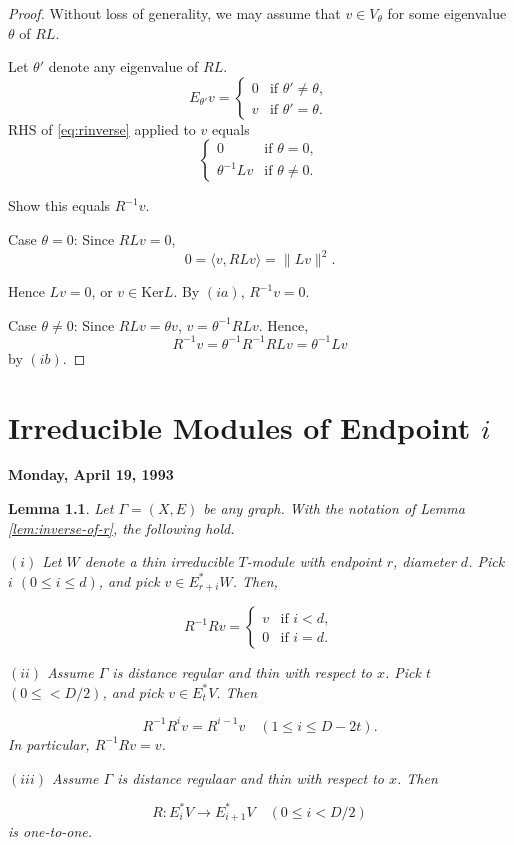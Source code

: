 \documentclass[
]{book}
\newtheorem{lemma}{Lemma}[chapter]
\theoremstyle{definition}
\theoremstyle{definition}
\theoremstyle{definition}
\theoremstyle{definition}
\theoremstyle{remark}
\begin{document}
\begin{proof}
Without loss of generality, we may assume that \(v\in V_\theta\) for some eigenvalue \(\theta\) of \(RL\).

Let \(\theta'\) denote any eigenvalue of \(RL\).
\[E_{\theta'}v = \begin{cases} 0 & \text{if } \theta'\neq \theta,\\
v & \text{if } \theta' = \theta.
\end{cases}\]
\(\mathrm{RHS}\) of \eqref{eq:rinverse} applied to \(v\) equals
\[\begin{cases} 0 & \text{if } \theta = 0,\\
\theta^{-1}Lv & \text{if } \theta \neq 0.
\end{cases}\]

Show this equals \(R^{-1}v\).

Case \(\theta = 0\):
Since \(RLv = 0\),
\[0 = \langle v, RLv\rangle = \|Lv\|^2.\]

Hence \(Lv = 0\), or \(v\in \mathrm{Ker}L\).
By \((ia)\), \(R^{-1}v = 0\).

Case \(\theta \neq 0\):
Since \(RLv = \theta v\), \(v = \theta^{-1}RLv\). Hence,
\[R^{-1}v = \theta^{-1}R^{-1}RLv = \theta^{-1}Lv\]
by \((ib)\).

\end{proof}

\hypertarget{lec32}{%
\chapter{\texorpdfstring{Irreducible Modules of Endpoint \(i\)}{Irreducible Modules of Endpoint i}}\label{lec32}}

\textbf{Monday, April 19, 1993}

\begin{lemma}
\protect\hypertarget{lem:action-of-r}{}\label{lem:action-of-r}Let \(\Gamma = (X, E)\) be any graph. With the notation of Lemma \ref{lem:inverse-of-r}, the following hold.

\((i)\) Let \(W\) denote a thin irreducible \(T\)-module with endpoint \(r\), diameter \(d\). Pick \(i\) \((0\leq i\leq d)\), and pick \(v\in E^*_{r+i}W\). Then,

\[R^{-1}R v = \begin{cases} v & \text{if } i<d,\\
0 & \text{if } i = d.
\end{cases}\]

\((ii)\) Assume \(\Gamma\) is distance regular and thin with respect to \(x\). Pick \(t\) \((0\leq < D/2)\), and pick \(v\in E^*_tV\). Then

\[R^{-1}R^iv = R^{i-1}v\quad (1\leq i\leq D-2t).\]
In particular, \(R^{-1}R v = v\).

\((iii)\) Assume \(\Gamma\) is distance regulaar and thin with respect to \(x\). Then

\[R: E^*_iV \to E^*_{i+1}V \quad (0\leq i< D/2)\]
is one-to-one.
\end{lemma}
\end{document}
